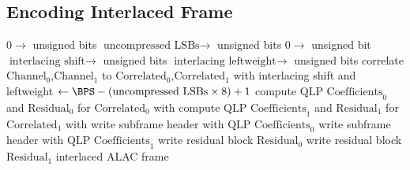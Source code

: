 \clearpage

\subsection{Encoding Interlaced Frame}
{
$0 \rightarrow$  unsigned bits
$\text{uncompressed LSBs} \rightarrow$  unsigned bits\;
$0 \rightarrow$  unsigned bit
$\text{interlacing shift} \rightarrow$  unsigned bits\;
$\text{interlacing leftweight} \rightarrow$  unsigned bits\;
correlate $\text{Channel}_0$,$\text{Channel}_1$ to $\text{Correlated}_0$,$\text{Correlated}_1$ with interlacing shift and leftweight\;
\SAMPLESIZE $\leftarrow \text{\BPS} - (\text{uncompressed LSBs} \times 8) + 1$\;
compute $\text{QLP Coefficients}_0$ and $\text{Residual}_0$ for $\text{Correlated}_0$ with \SAMPLESIZE\;
compute $\text{QLP Coefficients}_1$ and $\text{Residual}_1$ for $\text{Correlated}_1$ with \SAMPLESIZE\;
write subframe header with $\text{QLP Coefficients}_0$\;
write subframe header with $\text{QLP Coefficients}_1$\;
write residual block $\text{Residual}_0$\;
write residual block $\text{Residual}_1$\;
\Return interlaced ALAC frame\;
\EALGORITHM
}

